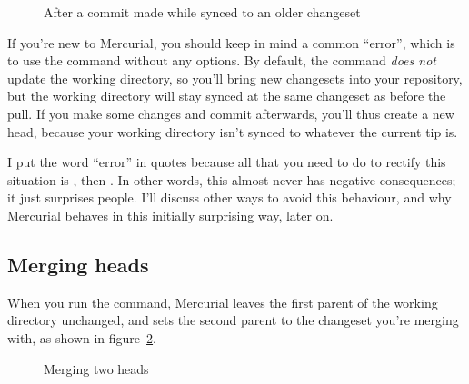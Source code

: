 \begin{figure}[ht]
  \centering
  \caption{After a commit made while synced to an older changeset}
  \label{fig:concepts:wdir-branch}
\end{figure}

\begin{note}
  If you're new to Mercurial, you should keep in mind a common
  ``error'', which is to use the  command without any
  options.  By default, the  command \emph{does not}
  update the working directory, so you'll bring new changesets into
  your repository, but the working directory will stay synced at the
  same changeset as before the pull.  If you make some changes and
  commit afterwards, you'll thus create a new head, because your
  working directory isn't synced to whatever the current tip is.

  I put the word ``error'' in quotes because all that you need to do
  to rectify this situation is , then .  In
  other words, this almost never has negative consequences; it just
  surprises people.  I'll discuss other ways to avoid this behaviour,
  and why Mercurial behaves in this initially surprising way, later
  on.
\end{note}

\subsection{Merging heads}

When you run the  command, Mercurial leaves the first
parent of the working directory unchanged, and sets the second parent
to the changeset you're merging with, as shown in
figure~\ref{fig:concepts:wdir-merge}.

\begin{figure}[ht]
  \centering
  \caption{Merging two heads}
  \label{fig:concepts:wdir-merge}
\end{figure}

